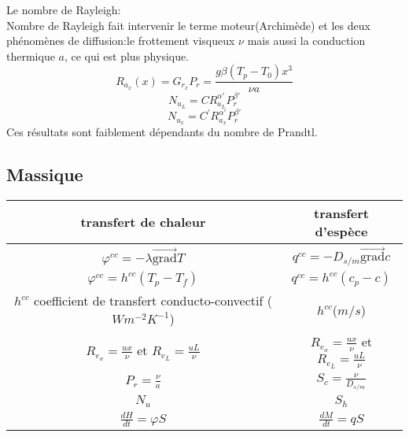 \documentclass{article}
\begin{document}
Le nombre de Rayleigh:\\
Nombre de Rayleigh fait intervenir le terme moteur(Archim\`ede) et les deux ph\'enom\`enes de diffusion:le frottement visqueux $\nu$ mais aussi la conduction thermique $a$, ce qui est plus physique.
$$R_{a_x}(x)=G_{r_x}P_r=\frac{ g\beta(T_p - T_0)x^3}{\nu a}$$
$$N_{u_L} = C R_{a_L}^{\alpha'}P_r^{\beta'}$$
$$N_{u_x} = C^{\prime} R_{a_x}^{\alpha'}P_r^{\beta'}$$
Ces r\'esultats sont faiblement d\'ependants du nombre de Prandtl.

\subsection{Massique}
\begin{tabular}{|c|c|}
\hline
transfert de chaleur & transfert d'esp\`ece \\
\hline
$\varphi^{cc}= - \lambda \vec{\mbox{grad}}T$ & $q^{cc}= - D_{s/m} \vec{\mbox{grad}}c $\\
\hline
$\varphi^{cc}=h^{cc}(T_p - T_f)$ & $q^{cc}=h^{cc}(c_p - c)$\\
\hline
$h^{cc}$ coefficient de transfert conducto-convectif ($Wm^{-2}K^{-1}$) & $h^{cc} $($m/s$) \\
\hline
$R_{e_x}=\frac{ux}{\nu}$ et $R_{e_L}=\frac{ uL}{\nu}$ & $R_{e_x}=\frac{ux}{\nu}$ et $R_{e_L}=\frac{ uL}{\nu}$ \\
\hline
$P_r=\frac{ \nu}{a} $& $S_c=\frac{\nu}{D_{s/m}} $\\
\hline
$N_u$ & $S_h $\\
\hline
$\frac{ dH}{dt}=\varphi S$ & $\frac{dM}{dt}=qS$\\
\hline
\end{tabular}
\end{document}
